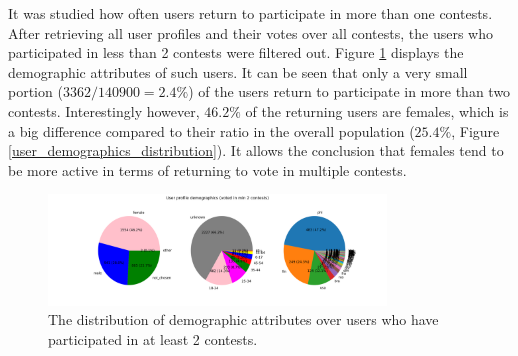 

It was studied how often users return to participate in more than one contests. After retrieving all user profiles and their votes over all contests, the users who participated in less than 2 contests were filtered out. Figure \ref{user_demographics_distribution-pruned} displays the demographic attributes of such users. It can be seen that only a very small portion ($3362 / 140900 = 2.4 \% $) of the users return to participate in more than two contests. Interestingly however, $46.2 \%$ of the returning users are females, which is a big difference compared to their ratio in the overall population ($25.4 \% $, Figure \ref{user_demographics_distribution}). It allows the conclusion that females tend to be more active in terms of returning to vote in multiple contests. 

\begin{figure}[h] 
    \begin{center}
        \includegraphics[width=0.8\textwidth]{Images/user_demographics_distribution-pruned}
        \caption{The distribution of demographic attributes over users who have participated in at least 2 contests.}
        \label{user_demographics_distribution-pruned}
    \end{center}
\end{figure}

